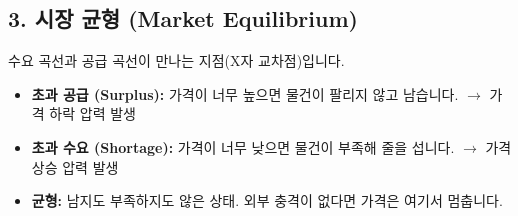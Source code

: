 \documentclass[11pt,a4paper]{article}
\begin{document}
\subsection{3. 시장 균형 (Market Equilibrium)}
수요 곡선과 공급 곡선이 만나는 지점(X자 교차점)입니다.
\begin{itemize}
    \item \textbf{초과 공급 (Surplus):} 가격이 너무 높으면 물건이 팔리지 않고 남습니다. $\rightarrow$ 가격 하락 압력 발생
    \item \textbf{초과 수요 (Shortage):} 가격이 너무 낮으면 물건이 부족해 줄을 섭니다. $\rightarrow$ 가격 상승 압력 발생
    \item \textbf{균형:} 남지도 부족하지도 않은 상태. 외부 충격이 없다면 가격은 여기서 멈춥니다.
\end{itemize}
\end{document}
